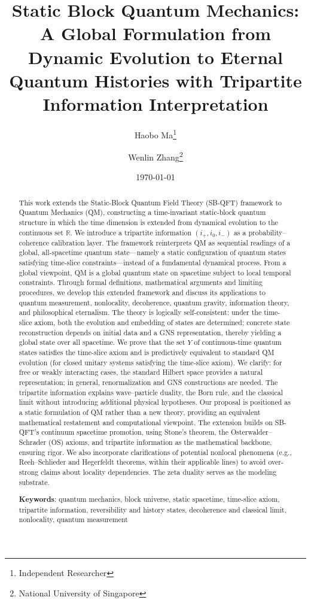 \documentclass[11pt]{article}
\title{Static Block Quantum Mechanics:\\ A Global Formulation from Dynamic Evolution to Eternal Quantum Histories with Tripartite Information Interpretation}
\author{Haobo Ma\thanks{Independent Researcher} \and Wenlin Zhang\thanks{National University of Singapore}}
\date{\today}
\theoremstyle{definition}
\theoremstyle{remark}
\begin{document}
\maketitle

\begin{abstract}
This work extends the Static-Block Quantum Field Theory (SB-QFT) framework to Quantum Mechanics (QM), constructing a time-invariant static-block quantum structure in which the time dimension is extended from dynamical evolution to the continuous set \( \mathbb{R} \). We introduce a tripartite information \( (i_+, i_0, i_-) \) as a probability--coherence calibration layer. The framework reinterprets QM as sequential readings of a global, all-spacetime quantum state---namely a static configuration of quantum states satisfying time-slice constraints---instead of a fundamental dynamical process. From a global viewpoint, QM is a global quantum state on spacetime subject to local temporal constraints. Through formal definitions, mathematical arguments and limiting procedures, we develop this extended framework and discuss its applications to quantum measurement, nonlocality, decoherence, quantum gravity, information theory, and philosophical eternalism. The theory is logically self-consistent: under the time-slice axiom, both the evolution and embedding of states are determined; concrete state reconstruction depends on initial data and a GNS representation, thereby yielding a global state over all spacetime. We prove that the set \( Y \) of continuous-time quantum states satisfies the time-slice axiom and is predictively equivalent to standard QM evolution (for closed unitary systems satisfying the time-slice axiom). We clarify: for free or weakly interacting cases, the standard Hilbert space provides a natural representation; in general, renormalization and GNS constructions are needed. The tripartite information explains wave--particle duality, the Born rule, and the classical limit without introducing additional physical hypotheses. Our proposal is positioned as a static formulation of QM rather than a new theory, providing an equivalent mathematical restatement and computational viewpoint. The extension builds on SB-QFT's continuum spacetime promotion, using Stone's theorem, the Osterwalder--Schrader (OS) axioms, and tripartite information as the mathematical backbone, ensuring rigor. We also incorporate clarifications of potential nonlocal phenomena (e.g., Reeh--Schlieder and Hegerfeldt theorems, within their applicable lines) to avoid over-strong claims about locality dependencies. The zeta duality serves as the modeling substrate.

\noindent\textbf{Keywords}: quantum mechanics, block universe, static spacetime, time-slice axiom, tripartite information, reversibility and history states, decoherence and classical limit, nonlocality, quantum measurement
\end{abstract}
\end{document}
